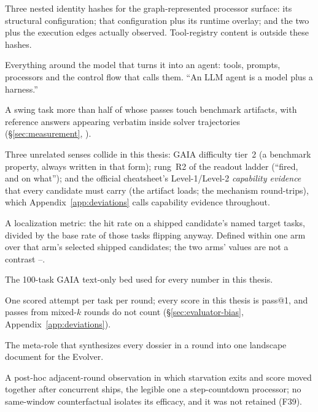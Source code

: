 \begin{description}[leftmargin=1.8em,labelsep=0.4em,itemsep=0.5pt,parsep=0pt,topsep=2pt]
\item[genotype / deployment / phenotype] Three nested identity hashes for
the graph-represented processor surface: its structural configuration; that
configuration plus its runtime overlay; and the two plus the execution edges
actually observed. Tool-registry content is outside these hashes.

\item[harness] Everything around the model that turns it into an agent:
tools, prompts, processors and the control flow that calls them. ``An LLM
agent is a model plus a harness.''

\item[leak-route task] A swing task more than half of whose passes touch
benchmark artifacts, with reference answers appearing verbatim inside
solver trajectories (\S\ref{sec:measurement}, ).

\item[level 2] Three unrelated senses collide in this thesis: GAIA
difficulty tier~2 (a benchmark property, always written in that form);
rung~R2 of the readout ladder (``fired, and on what''); and the official
cheatsheet's Level-1/Level-2 \emph{capability evidence} that every
candidate must carry (the artifact loads; the mechanism round-trips),
which Appendix~\ref{app:deviations} calls capability evidence throughout.

\item[lift] A localization metric: the hit rate on a shipped candidate's
named target tasks, divided by the base rate of those tasks flipping
anyway. Defined within one arm over that arm's selected shipped
candidates; the two arms' values are not a contrast --.

\item[no-pixel bed] The 100-task GAIA text-only bed used for every number
in this thesis.

\item[pass@1] One scored attempt per task per round; every score in this
thesis is pass@1, and passes from mixed-$k$ rounds do not count
(\S\ref{sec:evaluator-bias}, Appendix~\ref{app:deviations}).

\item[Planner] The meta-role that synthesizes every dossier in a round
into one landscape document for the Evolver.

\item[mechanism-consistent guard event] A post-hoc adjacent-round observation
in which starvation exits and score moved together after concurrent ships,
the legible one a step-countdown processor; no same-window counterfactual
isolates its efficacy, and it was not retained (F39).


\end{description}
